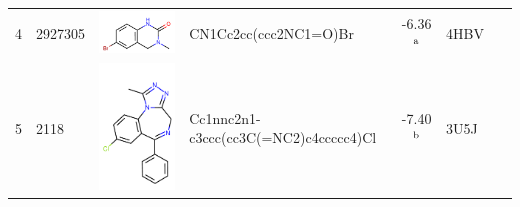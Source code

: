 \documentclass[aps,pre,twocolumn,nofootinbib,superscriptaddress,10pt, final,tightenlines]{revtex4-1}
\begin{document}
\begin{table}
\begin{center}
\begin{tabular}{llp{2cm}>{\ttfamily}lS[table-format=-1.2, table-figures-uncertainty=1]ll}
4        & 2927305                                & \parbox[c]{1em}{\includegraphics[scale=0.15]{figures/new-bromo/2927305.pdf}}  & CN1Cc2cc(ccc2NC1=O)Br                                            & -6.36$^{\rm a}$                               & 4HBV~\cite{Fish:2012:J.Med.Chem.}          & \cite{Fish:2012:J.Med.Chem.}            \\
5        & 2118                                   & \parbox[c]{1em}{\includegraphics[scale=0.15]{figures/new-bromo/2118.pdf}}     & Cc1nnc2n1-c3ccc(cc3C(=NC2)c4ccccc4)Cl                            & -7.40$^{\rm b}$                               & 3U5J~\cite{Fill:2012:Bioorg.Med.Chem.}     & \cite{Fill:2012:Bioorg.Med.Chem.}       \\ 

\end{tabular}
\end{center}
\end{table}
\end{document}
